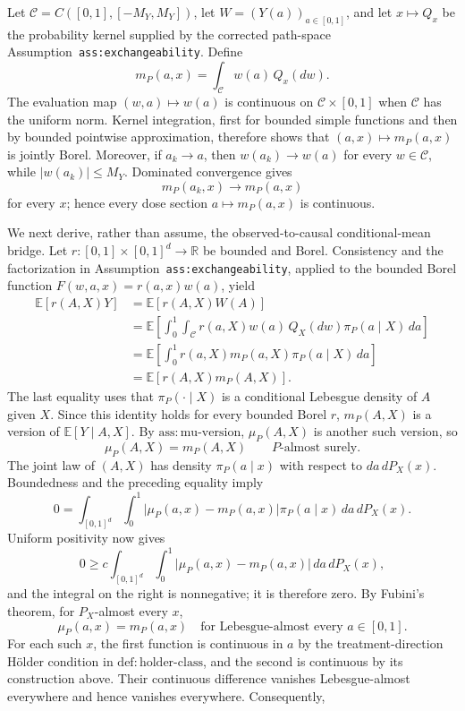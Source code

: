 Let \(\mathcal C=C([0,1],[-M_Y,M_Y])\), let \(W=(Y(a))_{a\in[0,1]}\), and let \(x\mapsto Q_x\) be the probability kernel supplied by the corrected path-space Assumption~\texttt{ass:exchangeability}. Define
\[
m_P(a,x)=\int_{\mathcal C}w(a)\,Q_x(dw).
\]
The evaluation map \((w,a)\mapsto w(a)\) is continuous on \(\mathcal C\times[0,1]\) when \(\mathcal C\) has the uniform norm. Kernel integration, first for bounded simple functions and then by bounded pointwise approximation, therefore shows that \((a,x)\mapsto m_P(a,x)\) is jointly Borel. Moreover, if \(a_k\to a\), then \(w(a_k)\to w(a)\) for every \(w\in\mathcal C\), while \(\lvert w(a_k)\rvert\le M_Y\). Dominated convergence gives
\[
m_P(a_k,x)\longrightarrow m_P(a,x)
\]
for every \(x\); hence every dose section \(a\mapsto m_P(a,x)\) is continuous.

We next derive, rather than assume, the observed-to-causal conditional-mean bridge. Let \(r:[0,1]\times[0,1]^d\to\mathbb R\) be bounded and Borel. Consistency and the factorization in Assumption~\texttt{ass:exchangeability}, applied to the bounded Borel function \(F(w,a,x)=r(a,x)w(a)\), yield
\[
\begin{aligned}
\mathbb E[r(A,X)Y]
&=\mathbb E[r(A,X)W(A)]\\
&=\mathbb E\!\left[
\int_0^1\int_{\mathcal C}r(a,X)w(a)\,Q_X(dw)\pi_P(a\mid X)\,da
\right]\\
&=\mathbb E\!\left[
\int_0^1 r(a,X)m_P(a,X)\pi_P(a\mid X)\,da
\right]\\
&=\mathbb E[r(A,X)m_P(A,X)].
\end{aligned}
\]
The last equality uses that \(\pi_P(\cdot\mid X)\) is a conditional Lebesgue density of \(A\) given \(X\). Since this identity holds for every bounded Borel \(r\), \(m_P(A,X)\) is a version of \(\mathbb E[Y\mid A,X]\). By \(\mathrm{ass:mu\text{-}version}\), \(\mu_P(A,X)\) is another such version, so
\[
\mu_P(A,X)=m_P(A,X)\qquad P\text{-almost surely}.
\]
The joint law of \((A,X)\) has density \(\pi_P(a\mid x)\) with respect to \(da\,dP_X(x)\). Boundedness and the preceding equality imply
\[
0=
\int_{[0,1]^d}\int_0^1
\lvert\mu_P(a,x)-m_P(a,x)\rvert\pi_P(a\mid x)\,da\,dP_X(x).
\]
Uniform positivity now gives
\[
0\ge
c\int_{[0,1]^d}\int_0^1
\lvert\mu_P(a,x)-m_P(a,x)\rvert\,da\,dP_X(x),
\]
and the integral on the right is nonnegative; it is therefore zero. By Fubini's theorem, for \(P_X\)-almost every \(x\),
\[
\mu_P(a,x)=m_P(a,x)
\quad\text{for Lebesgue-almost every }a\in[0,1].
\]
For each such \(x\), the first function is continuous in \(a\) by the treatment-direction H\"older condition in \(\mathrm{def:holder\text{-}class}\), and the second is continuous by its construction above. Their continuous difference vanishes Lebesgue-almost everywhere and hence vanishes everywhere. Consequently,
